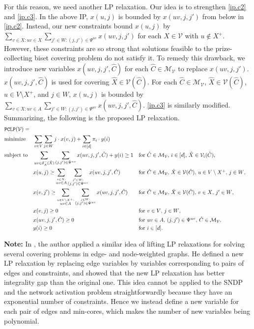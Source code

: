 \documentclass[11pt]{article}
\newcommand{\Mfam}{\mathcal{M}}
\newcommand{\Vfam}{\mathcal{V}}
\newcommand{\LP}{{\tt PCLP}}
\begin{document}
For this reason, we need another LP relaxation.
Our idea is to strengthen \eqref{ip.c2} and \eqref{ip.c3}.
In the above IP, 
$x(u,j)$ is bounded by $x(uv,j,j')$ from below in \eqref{ip.c2}.
Instead, our new constraints bound $x(u,j)$
by $\sum_{v \in X: uv \in X}\sum_{j'\in W:(j,j')\in \Psi^{uv}}x(uv,j,j')$ for each $\hat{X} \in \Vfam$ with
$u \not\in X^+$.
However, these constraints are so strong that solutions feasible
to the prize-collecting biset covering problem do not satisfy it.
To remedy this drawback, we introduce new variables $x(uv,j,j',\hat{C})$
for each $\hat{C} \in \Mfam_{\Vfam}$ to replace $x(uv,j,j')$.
 $x(uv,j,j',\hat{C})$ is used for covering $\hat{X} \in \Vfam(\hat{C})$.
For each $\hat{C} \in \Mfam_{\Vfam}$, $\hat{X} \in \Vfam(\hat{C})$, $u \in
V\setminus X^+$, and $j \in W$,
$x(u,j)$ is bounded by $\sum_{v \in
X:uv\in A}\sum_{j'\in W:(j,j')\in \Psi^{uv}}x(uv,j,j',\hat{C})$.
\eqref{ip.c3} is similarly modified.
Summarizing, the following is the proposed LP relaxation.
\begin{align}
 &{\LP}(\Vfam)=\hspace*{-2em} \notag\\
 &\mbox{minimize} && \sum_{v \in V}\sum_{j \in W}j \cdot x(v,j)
 +\sum_{i\in [d]}\pi_i \cdot y(i)\notag\\
&\mbox{subject to} &&
\sum_{uv \in \delta^-_A(\hat{X})} \sum_{(j,j')\in \Psi^{uv}}x(uv,j,j',\hat{C}) + y(i)\geq 1
&&\mbox{for $\hat{C} \in \Mfam_{\Vfam}$, $i\in [d]$, $\hat{X} \in \Vfam_i(\hat{C})$,}\label{lp-c1}\\
&&&
x(u,j) \geq \sum_{\stackrel{v \in X:}{uv \in A}}\sum_{\stackrel{j' \in W:}{(j,j')\in \Psi^{uv}}}x(uv,j,j',\hat{C}) &&
\mbox{for $\hat{C} \in \Mfam_{\Vfam}$, $\hat{X}\in \Vfam(\hat{C})$, $u \in V\setminus X^+$, $j \in W$,}\label{lp-c2}\\
&&&
 x(v,j') \geq 
 \sum_{\stackrel{u \in V\setminus X^+:}{uv\in A}}\sum_{\stackrel{j\in W:}{(j,j')\in\Psi^{uv}}}x(uv,j,j',\hat{C}) &&
\mbox{for $\hat{C}\in \Mfam_{\Vfam}$, $\hat{X}\in \Vfam(\hat{C})$, $v \in X$, $j' \in W$, }\label{lp-c3}\\
&&& x(v,j) \geq 0 &&\mbox{for $v \in V$, $j \in W$,}\notag \\
&&& x(uv,j,j',\hat{C}) \geq 0 &&\mbox{for $uv \in A$, $(j,j') \in \Psi^{uv}$, $\hat{C} \in \Mfam_{\Vfam}$,}\notag\\
&&& y(i) \geq 0 &&\mbox{for $i \in [d]$.}\notag
\end{align}

{\bf Note:}
In \cite{Fukunaga14}, the author applied a similar idea of lifting LP relaxations for solving several covering problems
in edge- and node-weighted graphs. He defined a new LP relaxation by 
replacing edge variables by variables corresponding to pairs of edges
and constraints, and showed that the new LP relaxation has better integrality gap than the original one. 
This idea cannot be applied to the SNDP and the network activation problem straightforwardly because
they have an exponential number of constraints. Hence we instead define a new variable for each pair of edges and
min-cores, which makes the number of new variables being polynomial.
\end{document}
